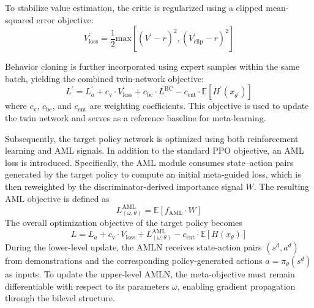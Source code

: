 \documentclass[lettersize,journal]{IEEEtran}
\begin{document}
To stabilize value estimation, the critic is regularized using a clipped mean-squared error objective:
\begin{equation}
\label{Value_loss}
V^{\prime}_{\text{loss}}=\frac{1}{2}\text{max}[(V^{\prime}-r)^2,(V^{\prime}_{\text{clip}}-r)^2]
\end{equation}

Behavior cloning is further incorporated using expert samples within the same batch, yielding the combined twin-network objective:
\begin{equation}
\label{tmp_loss}
L^{\prime} = L^{\prime}_{a} + c_{\text{v}} \cdot V^{\prime}_{\text{loss}} + c_{\text{bc}} \cdot L^{\text{BC}} - c_{\text{ent}} \cdot \mathbb{E}[H^{\prime}(x_{\theta^{\prime}})]
\end{equation}
where $c_\text{v}$, $c_{\text{bc}}$, and $c_{\text{ent}}$ are weighting coefficients. This objective is used to update the twin network and serves as a reference baseline for meta-learning.

Subsequently, the target policy network is optimized using both reinforcement learning and AML signals. In addition to the standard PPO objective, an AML loss is introduced. Specifically, the AML module consumes state–action pairs generated by the target policy to compute an initial meta-guided loss, which is then reweighted by the discriminator-derived importance signal $W$. The resulting AML objective is defined as
\begin{equation}
  L^{\text{AML}}_{(\omega,\theta)}=\mathbb{E}[f_{\text{AML}}\cdot W]
\end{equation}
The overall optimization objective of the target policy becomes
\begin{equation}
\label{actor_loss}
  L = L_{a} + c_{\text{v}} \cdot V_{\text{loss}} + L^{\text{AML}}_{(\omega,\theta)} - c_{\text{ent}} \cdot \mathbb{E}[H(x_{\theta})]
\end{equation}
During the lower-level update, the AMLN receives state-action pairs $(s^d, a^d)$ from demonstrations and the corresponding policy-generated actions $a = \pi_\theta(s^d)$ as inputs. To update the upper-level AMLN, the meta-objective must remain differentiable with respect to its parameters $\omega$, enabling gradient propagation through the bilevel structure.
\end{document}
